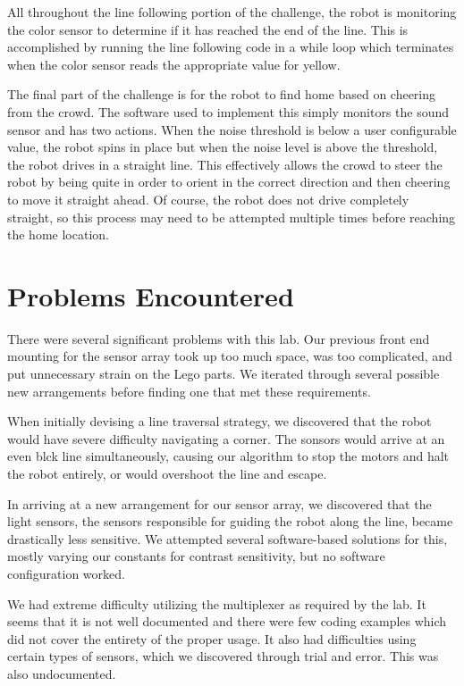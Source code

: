 \documentclass[journal]{../IEEEtran}
\begin{document}
All throughout the line following portion of the challenge, the robot is monitoring the color sensor to determine if it has reached the end of the line. This is accomplished by running the line following code in a while loop which terminates when the color sensor reads the appropriate value for yellow.

The final part of the challenge is for the robot to find home based on cheering from the crowd. The software used to implement this simply monitors the sound sensor and has two actions. When the noise threshold is below a user configurable value, the robot spins in place but when the noise level is above the threshold, the robot drives in a straight line. This effectively allows the crowd to steer the robot by being quite in order to orient in the correct direction and then cheering to move it straight ahead. Of course, the robot does not drive completely straight, so this process may need to be attempted multiple times before reaching the home location.

\section{Problems Encountered}\label{S.problems}

There were several significant problems with this lab. Our previous front end mounting for the sensor array took up too much space, was too complicated, and put unnecessary strain on the Lego parts. We iterated through several possible new arrangements before finding one that met these requirements.

When initially devising a line traversal strategy, we discovered that the robot would have severe difficulty navigating a corner. The sonsors would arrive at an even blck line simultaneously, causing our algorithm to stop the motors and halt the robot entirely, or would overshoot the line and escape. 

In arriving at a new arrangement for our sensor array, we discovered that the light sensors, the sensors responsible for guiding the robot along the line, became drastically less sensitive. We attempted several software-based solutions for this, mostly varying our constants for contrast sensitivity, but no software configuration worked.

We had extreme difficulty utilizing the multiplexer as required by the lab. It seems that it is not well documented and there were few coding examples which did not cover the entirety of the proper usage. It also had difficulties using certain types of sensors, which we discovered through trial and error. This was also undocumented.
\end{document}
